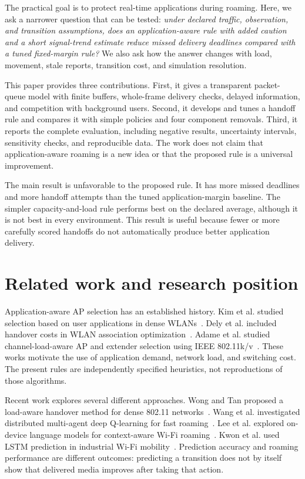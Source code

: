 \documentclass[11pt,a4paper]{article}
\begin{document}
The practical goal is to protect real-time applications during roaming. Here, we ask a narrower question that can be tested: \emph{under declared traffic, observation, and transition assumptions, does an application-aware rule with added caution and a short signal-trend estimate reduce missed delivery deadlines compared with a tuned fixed-margin rule?} We also ask how the answer changes with load, movement, stale reports, transition cost, and simulation resolution.

This paper provides three contributions. First, it gives a transparent packet-queue model with finite buffers, whole-frame delivery checks, delayed information, and competition with background users. Second, it develops and tunes a handoff rule and compares it with simple policies and four component removals. Third, it reports the complete evaluation, including negative results, uncertainty intervals, sensitivity checks, and reproducible data. The work does not claim that application-aware roaming is a new idea or that the proposed rule is a universal improvement.

The main result is unfavorable to the proposed rule. It has more missed deadlines and more handoff attempts than the tuned application-margin baseline. The simpler capacity-and-load rule performs best on the declared average, although it is not best in every environment. This result is useful because fewer or more carefully scored handoffs do not automatically produce better application delivery.

\section{Related work and research position}
Application-aware AP selection has an established history. Kim et al. studied selection based on user applications in dense WLANs~\cite{F01}. Dely et al. included handover costs in WLAN association optimization~\cite{F02}. Adame et al. studied channel-load-aware AP and extender selection using IEEE 802.11k/v~\cite{F03}. These works motivate the use of application demand, network load, and switching cost. The present rules are independently specified heuristics, not reproductions of those algorithms.

Recent work explores several different approaches. Wong and Tan proposed a load-aware handover method for dense 802.11 networks~\cite{R03}. Wang et al. investigated distributed multi-agent deep Q-learning for fast roaming~\cite{R06}. Lee et al. explored on-device language models for context-aware Wi-Fi roaming~\cite{R04}. Kwon et al. used LSTM prediction in industrial Wi-Fi mobility~\cite{R13}. Prediction accuracy and roaming performance are different outcomes: predicting a transition does not by itself show that delivered media improves after taking that action.
\end{document}

